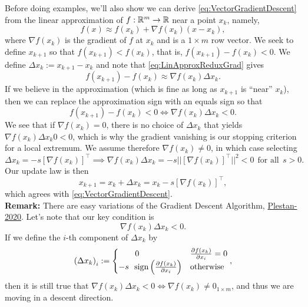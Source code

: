 Before doing examples, we'll also show we can derive \eqref{eq:VectorGradientDescent} from the linear approximation of $f:\mathbb R^m \to \mathbb R$ near a point $x_k$, namely,
\begin{equation}
    \label{eq:LinApproxReduxGrad}
    f(x) \approx f(x_k) + \nabla f(x_k) \left(x-x_k  \right),
\end{equation}
where $\nabla f(x_k)$ is the gradient of $f$ at $x_k$ and is a $1 \times m $ row vector. 
We seek to define $x_{k+1}$ so that $f(x_{k+1}) < f(x_k)$, that is, $f(x_{k+1}) - f(x_k) < 0$. We define $\Delta x_k := x_{k+1}-x_k$ and note that
\eqref{eq:LinApproxReduxGrad} gives
\begin{equation}
    \label{eq:LinApproxReduxGrad02}
    f(x_{k+1}) - f(x_k) \approx \nabla f(x_k) \Delta x_k.
\end{equation} 
If we believe in the approximation (which is fine as long as $x_{k+1}$ is ``near'' $x_k$), then we can replace the approximation sign with an equals sign so that
\begin{equation}
    \label{eq:LinApproxReduxGrad03}
    f(x_{k+1}) - f(x_k) < 0 \iff  \nabla f(x_k)\Delta x_k < 0.
\end{equation} 
We see that if $ \nabla f(x_k) =0$, there is no choice of  $\Delta x_k$ that yields $  \nabla f(x_k)\Delta x_k 0 < 0$, which is why the gradient vanishing is our stopping criterion for a local extremum. We assume  therefore $ \nabla f(x_k) \neq 0$, in which case selecting
$$  \Delta x_k = - s\left[\nabla f(x_k)\right]^\top \implies \nabla f(x_k)\Delta x_k = -s ||\left[\nabla f(x_k)  \right]^\top||^2 < 0~~\text{for all}~~s>0. $$
Our update law is then 
$$x_{k+1} = x_k + \Delta x_k =  x_k - s\left[\nabla f(x_k)\right]^\top,$$
which agrees with \eqref{eq:VectorGradientDescent}. \\

\textbf{Remark:} There are easy variations of the Gradient Descent Algorithm,  \href{https://hal.archives-ouvertes.fr/hal-02096241/document}{Plestan-2020}. Let's note that our key condition is   $$ \nabla f(x_k)\Delta x_k < 0.$$
If we define the $i$-th component of $\Delta x_k$ by
$$ \left( \Delta x_k \right)_i:= \begin{cases} ~~~~~~0  & \frac{\partial f(x_k)}{\partial x_i}  = 0 \\
-s~~ {\rm sign}\left( \frac{\partial f(x_k)}{\partial x_i} \right) & \text{otherwise}\end{cases}, $$
then it is still true that $\nabla f(x_k)\Delta x_k < 0 \iff \nabla f(x_k) \neq 0_{1 \times m}$, and thus
we are moving in a descent direction. 

